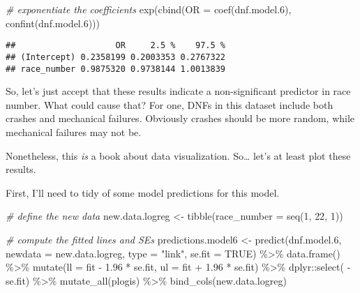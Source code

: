 \documentclass[
]{book}
\newenvironment{Shaded}{\begin{snugshade}}{\end{snugshade}}
\newcommand{\AttributeTok}[1]{\textcolor[rgb]{0.77,0.63,0.00}{#1}}
\newcommand{\CommentTok}[1]{\textcolor[rgb]{0.56,0.35,0.01}{\textit{#1}}}
\newcommand{\ConstantTok}[1]{\textcolor[rgb]{0.00,0.00,0.00}{#1}}
\newcommand{\DecValTok}[1]{\textcolor[rgb]{0.00,0.00,0.81}{#1}}
\newcommand{\FloatTok}[1]{\textcolor[rgb]{0.00,0.00,0.81}{#1}}
\newcommand{\FunctionTok}[1]{\textcolor[rgb]{0.00,0.00,0.00}{#1}}
\newcommand{\NormalTok}[1]{#1}
\newcommand{\OtherTok}[1]{\textcolor[rgb]{0.56,0.35,0.01}{#1}}
\newcommand{\SpecialCharTok}[1]{\textcolor[rgb]{0.00,0.00,0.00}{#1}}
\newcommand{\StringTok}[1]{\textcolor[rgb]{0.31,0.60,0.02}{#1}}
\begin{document}
\begin{Shaded}
\begin{Highlighting}[]
\CommentTok{\# exponentiate the coefficients}
\FunctionTok{exp}\NormalTok{(}\FunctionTok{cbind}\NormalTok{(}\AttributeTok{OR =} \FunctionTok{coef}\NormalTok{(dnf.model}\FloatTok{.6}\NormalTok{), }\FunctionTok{confint}\NormalTok{(dnf.model}\FloatTok{.6}\NormalTok{)))}
\end{Highlighting}
\end{Shaded}

\begin{verbatim}
##                    OR     2.5 %    97.5 %
## (Intercept) 0.2358199 0.2003353 0.2767322
## race_number 0.9875320 0.9738144 1.0013839
\end{verbatim}

So, let's just accept that these results indicate a non-significant predictor in race number. What could cause that? For one, DNFs in this dataset include both crashes and mechanical failures. Obviously crashes should be more random, while mechanical failures may not be.

Nonetheless, this \emph{is} a book about data visualization. So\ldots{} let's at least plot these results.

First, I'll need to tidy of some model predictions for this model.

\begin{Shaded}
\begin{Highlighting}[]
\CommentTok{\# define the new data}
\NormalTok{new.data.logreg }\OtherTok{\textless{}{-}} \FunctionTok{tibble}\NormalTok{(}\AttributeTok{race\_number =} \FunctionTok{seq}\NormalTok{(}\DecValTok{1}\NormalTok{, }\DecValTok{22}\NormalTok{, }\DecValTok{1}\NormalTok{))}

\CommentTok{\# compute the fitted lines and SE\textquotesingle{}s}
\NormalTok{predictions.model6 }\OtherTok{\textless{}{-}}  \FunctionTok{predict}\NormalTok{(dnf.model}\FloatTok{.6}\NormalTok{,}
                               \AttributeTok{newdata =}\NormalTok{ new.data.logreg,}
                               \AttributeTok{type =} \StringTok{"link"}\NormalTok{,}
                               \AttributeTok{se.fit =} \ConstantTok{TRUE}\NormalTok{) }\SpecialCharTok{\%\textgreater{}\%} 
  \FunctionTok{data.frame}\NormalTok{() }\SpecialCharTok{\%\textgreater{}\%}
  \FunctionTok{mutate}\NormalTok{(}\AttributeTok{ll =}\NormalTok{ fit }\SpecialCharTok{{-}} \FloatTok{1.96} \SpecialCharTok{*}\NormalTok{ se.fit,}
         \AttributeTok{ul =}\NormalTok{ fit }\SpecialCharTok{+} \FloatTok{1.96} \SpecialCharTok{*}\NormalTok{ se.fit) }\SpecialCharTok{\%\textgreater{}\%}
\NormalTok{  dplyr}\SpecialCharTok{::}\FunctionTok{select}\NormalTok{( }\SpecialCharTok{{-}}\NormalTok{se.fit) }\SpecialCharTok{\%\textgreater{}\%} 
  \FunctionTok{mutate\_all}\NormalTok{(plogis) }\SpecialCharTok{\%\textgreater{}\%}
  \FunctionTok{bind\_cols}\NormalTok{(new.data.logreg)}
\end{Highlighting}
\end{Shaded}
\end{document}
